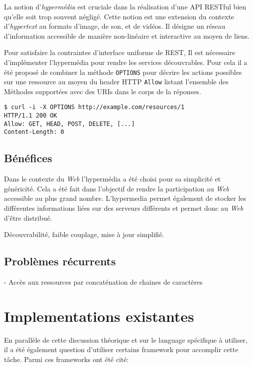 \documentclass[a4paper, 11pt]{report}
\begin{document}
La notion d'\emph{hypermédia} est cruciale dans la réalisation d'une
API RESTful bien qu'elle soit trop souvent négligé.  Cette notion est
une extension du contexte d'\emph{hypertext} au formats d'image, de
son, et de vidéos.  Il désigne un réseau d'information accessible de
manière non-linéaire et interactive au moyen de liens.

Pour satisfaire la contraintes d'interface uniforme de REST, Il est
nécessaire d'implémenter l'hypermédia pour rendre les services
découvrables. Pour cela il a été proposé de combiner la méthode
\verb=OPTIONS= pour décrire les actions possibles sur une ressource au
moyen du header HTTP \verb=Allow= listant l'ensemble des Méthodes
supportées avec des URIs dans le corps de la réponses.

\begin{verbatim}
$ curl -i -X OPTIONS http://example.com/resources/1
HTTP/1.1 200 OK
Allow: GET, HEAD, POST, DELETE, [...]
Content-Length: 0
\end{verbatim}

\subsection{Bénéfices}

Dans le contexte du \emph{Web} l'hypermédia a été choisi pour sa
simplicité et généricité.  Cela a été fait dans l'objectif de rendre
la participation au \emph{Web} accessible au plus grand nombre.
L'hypermedia permet également de stocker les différentes informations
liées sur des serveurs différents et permet donc au \emph{Web} d'être
distribué.

Découvrabilité, faible couplage, mise à jour simplifié.

\subsection{Problèmes récurrents}

- Accès aux ressources par concaténation de chaines de caractères

\section{Implementations existantes}

En parallèle de cette discussion théorique et sur le language
spécifique à utiliser, il a été également question d'utiliser certains
framework pour accomplir cette tâche. Parmi ces frameworks ont été
cité:
\end{document}
